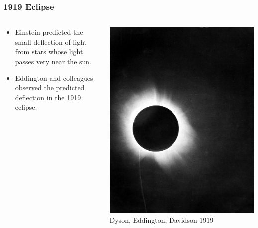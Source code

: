 \documentclass{beamer}
\begin{document}
    \frame
    {
        \frametitle{1919 Eclipse}

        \begin{columns}
            \begin{column}{0.5\textwidth}    
                \begin{itemize}

                    \item Einstein predicted the small deflection of light from
                        stars whose light passes very near the sun.

                    \item Eddington and colleagues observed the predicted
                        deflection in the 1919 eclipse.

                \end{itemize}
            \end{column}
            \begin{column}{0.5\textwidth}
                \begin{center}
                    \includegraphics[width=\textwidth]{1919_eclipse_positive.jpg}
                    \newline
                    {\tiny Dyson, Eddington, Davidson 1919}
                \end{center}
            \end{column}
        \end{columns}
    }
\end{document}
